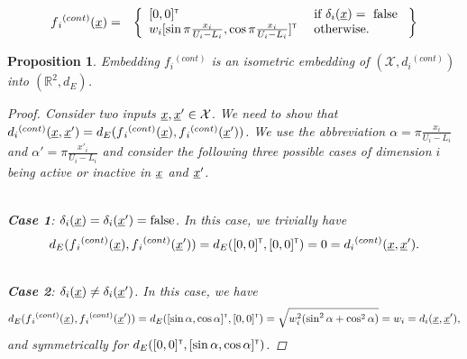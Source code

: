 \documentclass[letterpaper]{article}
\newcommand{\vect}[1]{\underline{\smash{#1}}}
\renewcommand{\v}[1]{\vect{#1}}
\newcommand{\reals}{\mathds{R}}
\newcommand{\sX}{\mathcal{X}}
\newcommand\transpose{{\textrm{\tiny{\sf{T}}}}}
\newtheorem{prop}[thm]{Proposition}
\begin{document}
\begin{eqnarray}
\nonumber{}f{_i}^{(cont)}(\v{x}) & = & \left\{\begin{array}{ll}
[0,0]^\transpose & \textrm{ if } \delta_i(\v{x}) = \textrm{ false }\\
\nonumber{} w_i [\sin{\pi\frac{x_i}{U_i-L_i}}, \cos{\pi\frac{x_i}{U_i-L_i}}]^\transpose & \textrm{ otherwise.}\end{array}\right\}
\end{eqnarray}

\begin{prop}Embedding $f{_i}^{(cont)}$ is an isometric embedding of $(\sX, d{_i}^{(cont)})$ into $(\reals^2, d_E)$.
\label{prop:f_d_cont_isometric}
\begin{proof}
Consider two inputs $\v{x},\v{x}' \in \sX$. We need to show that $d{_i}^{(cont)}(\v{x},\v{x}') = d_E(f{_i}^{(cont)}(\v{x}),f{_i}^{(cont)}(\v{x}'))$.
We use the abbreviation $\alpha = \pi\frac{x_i}{U_i-L_i}$ and $\alpha' = \pi\frac{x'_i}{U_i-L_i}$ and consider the following three possible cases of dimension $i$ being active or inactive in $\v{x}$ and $\v{x}'$.

~\\\noindent{}\textbf{Case 1}: $\delta_i(\v{x}) = \delta_i(\v{x}') = \textrm{false}$.
In this case, we trivially have 
\[d_E(f{_i}^{(cont)}(\v{x}),f{_i}^{(cont)}(\v{x}')) = d_E([0,0]^\transpose, [0,0]^\transpose) = 0 = d{_i}^{(cont)}(\v{x},\v{x}').\]

~\\\noindent{}\textbf{Case 2}: $\delta_i(\v{x}) \neq \delta_i(\v{x}')$. In this case, we have
\[d_E(f{_i}^{(cont)}(\v{x}),f{_i}^{(cont)}(\v{x}')) = d_E([\sin{\alpha}, \cos{\alpha}]^\transpose, [0,0]^\transpose) = \sqrt{w_i^2 (\sin^2{\alpha} + \cos^2{\alpha})} = w_i = d_i(\v{x},\v{x}'),\]
and symmetrically for $d_E([0,0]^\transpose, [\sin{\alpha}, \cos{\alpha}]^\transpose)$.


\end{proof}
\end{prop}
\end{document}
